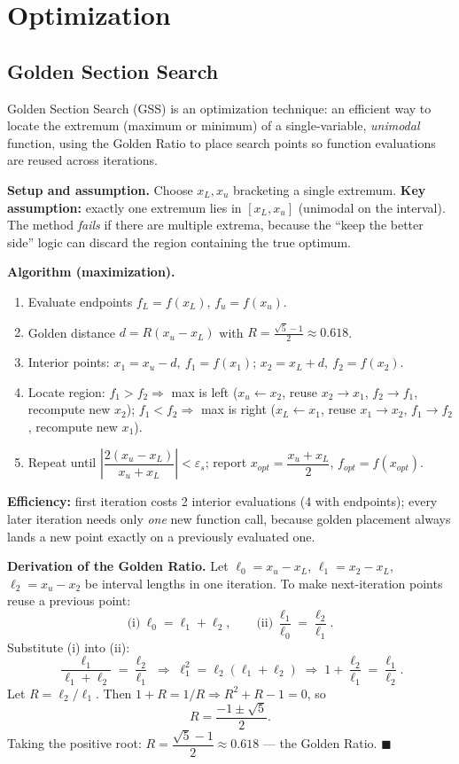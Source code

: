 \section{Optimization}

\subsection{Golden Section Search}

\begin{defbox}
Golden Section Search (GSS) is an optimization technique: an efficient way to locate the extremum (maximum or minimum) of a single-variable, \emph{unimodal} function, using the Golden Ratio to place search points so function evaluations are reused across iterations.
\end{defbox}

\textbf{Setup and assumption.} Choose $x_L, x_u$ bracketing a single extremum. \textbf{Key assumption:} exactly one extremum lies in $[x_L,x_u]$ (unimodal on the interval). The method \emph{fails} if there are multiple extrema, because the ``keep the better side'' logic can discard the region containing the true optimum.

\textbf{Algorithm (maximization).}
\begin{enumerate}
\item Evaluate endpoints $f_L = f(x_L)$, $f_u = f(x_u)$.
\item Golden distance $d = R(x_u-x_L)$ with $R=\tfrac{\sqrt5-1}{2}\approx 0.618$.
\item Interior points: $x_1 = x_u - d,\ f_1=f(x_1)$; \quad $x_2 = x_L+d,\ f_2=f(x_2)$.
\item Locate region: $f_1>f_2 \Rightarrow$ max is left ($x_u \gets x_2$, reuse $x_2\to x_1$, $f_2\to f_1$, recompute new $x_2$); $f_1<f_2 \Rightarrow$ max is right ($x_L\gets x_1$, reuse $x_1\to x_2$, $f_1 \to f_2$, recompute new $x_1$).
\item Repeat until $\left|\dfrac{2(x_u-x_L)}{x_u+x_L}\right| < \varepsilon_s$; report $x_{opt}=\dfrac{x_u+x_L}{2}$, $f_{opt}=f(x_{opt})$.
\end{enumerate}
\textbf{Efficiency:} first iteration costs 2 interior evaluations (4 with endpoints); every later iteration needs only \emph{one} new function call, because golden placement always lands a new point exactly on a previously evaluated one.

\begin{examplebox}
\textbf{Derivation of the Golden Ratio.} Let $\ell_0=x_u-x_L$, $\ell_1=x_2-x_L$, $\ell_2=x_u-x_2$ be interval lengths in one iteration. To make next-iteration points reuse a previous point:
\[
\text{(i)}\ \ell_0=\ell_1+\ell_2, \qquad \text{(ii)}\ \frac{\ell_1}{\ell_0}=\frac{\ell_2}{\ell_1}.
\]
Substitute (i) into (ii):
\[
\frac{\ell_1}{\ell_1+\ell_2} = \frac{\ell_2}{\ell_1} \;\Longrightarrow\; \ell_1^2 = \ell_2(\ell_1+\ell_2) \;\Longrightarrow\; 1+\frac{\ell_2}{\ell_1} = \frac{\ell_1}{\ell_2}.
\]
Let $R=\ell_2/\ell_1$. Then $1+R = 1/R \Rightarrow R^2+R-1=0$, so
\[
R = \frac{-1\pm\sqrt5}{2}.
\]
Taking the positive root: $R = \dfrac{\sqrt5-1}{2}\approx 0.618$ — the Golden Ratio. $\blacksquare$
\end{examplebox}

